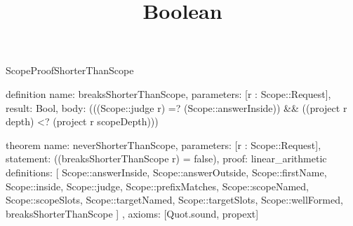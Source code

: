 \begin{lexlean}{ScopeProofShorterThanScope}
\title{Boolean}
\begin{semanticmodule}
definition{
  name: breaksShorterThanScope,
  parameters: [r : Scope::Request],
  result: Bool,
  body: (((Scope::judge r) =? (Scope::answerInside)) && ((project r depth) <? (project r scopeDepth)))
}

theorem{
  name: neverShorterThanScope,
  parameters: [r : Scope::Request],
  statement: ((breaksShorterThanScope r) = false),
  proof: linear_arithmetic{
    definitions: [
      Scope::answerInside,
      Scope::answerOutside,
      Scope::firstName,
      Scope::inside,
      Scope::judge,
      Scope::prefixMatches,
      Scope::scopeNamed,
      Scope::scopeSlots,
      Scope::targetNamed,
      Scope::targetSlots,
      Scope::wellFormed,
      breaksShorterThanScope
    ]
  },
  axioms: [Quot.sound, propext]
}
\end{semanticmodule}
\end{lexlean}
